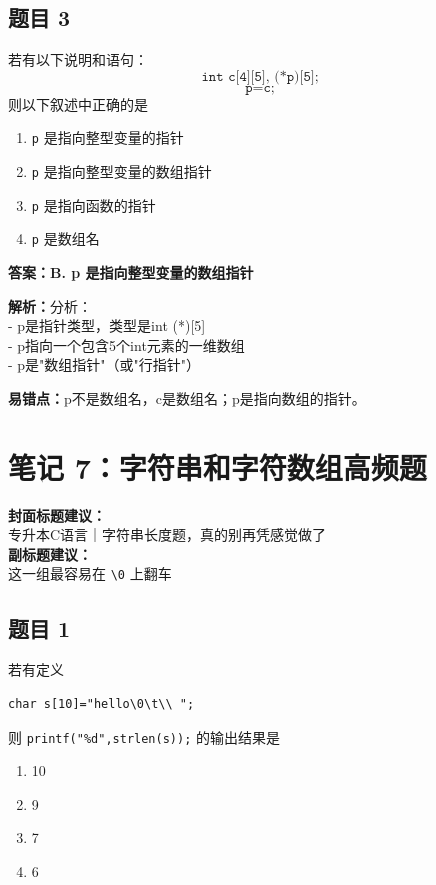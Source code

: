 \documentclass[12pt,a4paper]{ctexart}
\begin{document}
\subsection*{题目 3}
若有以下说明和语句：
\[
	\texttt{int c[4][5], (*p)[5];}
\]
\[
	\texttt{p=c;}
\]
则以下叙述中正确的是
\begin{enumerate}[label=\Alph*.]
	\item \texttt{p} 是指向整型变量的指针
	\item \texttt{p} 是指向整型变量的数组指针
	\item \texttt{p} 是指向函数的指针
	\item \texttt{p} 是数组名
\end{enumerate}

\begin{answerbox}
	\textbf{答案：B. p 是指向整型变量的数组指针}

	\textbf{解析：}分析：\\
	- p是指针类型，类型是int (*)[5]\\
	- p指向一个包含5个int元素的一维数组\\
	- p是"数组指针"（或"行指针"）

	\textbf{易错点：}p不是数组名，c是数组名；p是指向数组的指针。
\end{answerbox}

\newpage

\section{笔记 7：字符串和字符数组高频题}
\begin{coverbox}
	\textbf{封面标题建议：}\\
	专升本C语言｜字符串长度题，真的别再凭感觉做了\\
	\textbf{副标题建议：}\\
	这一组最容易在 \texttt{\textbackslash 0} 上翻车
\end{coverbox}

\subsection*{题目 1}
若有定义
\begin{lstlisting}
char s[10]="hello\0\t\\ ";
\end{lstlisting}
则 \texttt{printf("\%d",strlen(s));} 的输出结果是
\begin{enumerate}[label=\Alph*.]
	\item 10
	\item 9
	\item 7
	\item 6
\end{enumerate}
\end{document}
